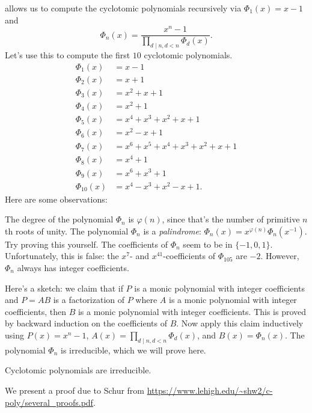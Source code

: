 \documentclass[11pt]{scrartcl}
\begin{document}
 allows us to compute the cyclotomic polynomials recursively via $\Phi_1(x) = x - 1$ and
\[\Phi_n(x) = \frac{x^n - 1}{\prod_{d \mid n, d < n}\Phi_d(x)}.\]
Let's use this to compute the first $10$ cyclotomic polynomials.
\begin{align*}
	\Phi_1(x) &= x - 1 \\
	\Phi_2(x) &= x + 1 \\
	\Phi_3(x) &= x^2 + x + 1 \\
	\Phi_4(x) &= x^2 + 1 \\
	\Phi_5(x) &= x^4 + x^3 + x^2 + x + 1 \\
	\Phi_6(x) &= x^2 - x + 1 \\
	\Phi_7(x) &= x^6 + x^5 + x^4 + x^3 + x^2 + x + 1 \\
	\Phi_8(x) &= x^4 + 1 \\
	\Phi_9(x) &= x^6 + x^3 + 1 \\
	\Phi_{10}(x) &= x^4 - x^3 + x^2 - x + 1.
\end{align*}
Here are some observations:
\begin{itemize}
	\ii The degree of the polynomial $\Phi_n$ is $\varphi(n)$, since that's the number of primitive $n$th roots of unity.
	\ii The polynomial $\Phi_n$ is a \emph{palindrome}: $\Phi_n(x) = x^{\varphi(n)}\Phi_n(x^{-1})$. Try proving this yourself.
	\ii The coefficients of $\Phi_n$ seem to be in $\{-1,0,1\}$. Unfortunately, this is false: the $x^7$- and $x^{41}$-coefficients of $\Phi_{105}$ are $-2$. However, $\Phi_n$ always has integer coefficients.
	
	Here's a sketch: we claim that if $P$ is a monic polynomial with integer coefficients and $P = AB$ is a factorization of $P$ where $A$ is a monic polynomial with integer coefficients, then $B$ is a monic polynomial with integer coefficients. This is proved by backward induction on the coefficients of $B$. Now apply this claim inductively using $P(x) = x^n - 1$, $A(x) = \prod_{d \mid n,d < n}\Phi_d(x)$, and $B(x) = \Phi_n(x)$.
	\ii The polynomial $\Phi_n$ is irreducible, which we will prove here.
\end{itemize}

\begin{theorem}
	Cyclotomic polynomials are irreducible.
\end{theorem}

We present a proof due to Schur from \url{https://www.lehigh.edu/~shw2/c-poly/several_proofs.pdf}.
\end{document}
